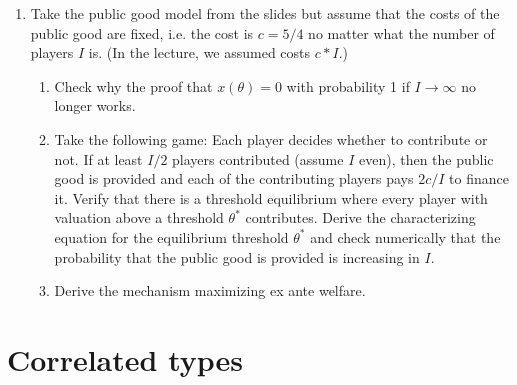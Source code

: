 \documentclass[a4paper,12pt]{article}
\begin{document}
\begin{enumerate}
\item Take the public good model from the slides but assume that the costs of the public good are fixed, i.e. the cost is $c=5/4$ no matter what the number of players $I$ is. (In the lecture, we assumed costs $c*I$.)
  \begin{enumerate}
  \item  Check why the proof that $x(\theta )=0$ with probability 1 if $I\rightarrow\infty$ no longer works.
  \item Take the following game: Each player decides whether to contribute or not. If at least $I/2$ players contributed (assume $I$ even), then the public good is provided and each of the contributing players pays $2c/I$ to finance it. Verify that there is a threshold equilibrium where every player with valuation above a threshold $\theta ^*$ contributes. Derive the characterizing equation for the equilibrium threshold $\theta ^*$ and check numerically that the probability that the public good is provided is increasing in $I$.
  \item Derive the mechanism maximizing ex ante welfare.
  \end{enumerate}
\end{enumerate}

\section{Correlated types}
\label{sec:correlated-types}
\end{document}
